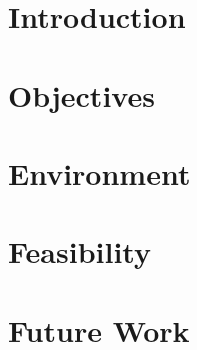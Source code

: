 \documentclass[conference]{IEEEtran}
\begin{document}
\maketitle

\section{Introduction}

\section{Objectives}

\section {Environment}

\section{Feasibility}

\section{Future Work}



%
\end{document}
